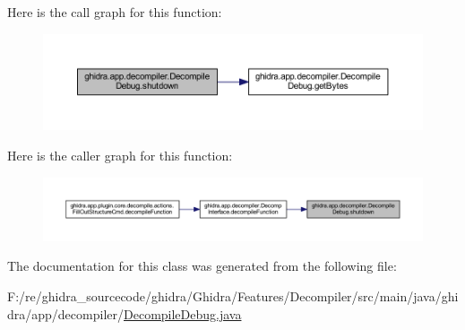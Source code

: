 Here is the call graph for this function\+:
\nopagebreak
\begin{figure}[H]
\begin{center}
\leavevmode
\includegraphics[width=350pt]{classghidra_1_1app_1_1decompiler_1_1_decompile_debug_a31d7bdb71f9cc5554a4c06d433e806d0_cgraph}
\end{center}
\end{figure}
Here is the caller graph for this function\+:
\nopagebreak
\begin{figure}[H]
\begin{center}
\leavevmode
\includegraphics[width=350pt]{classghidra_1_1app_1_1decompiler_1_1_decompile_debug_a31d7bdb71f9cc5554a4c06d433e806d0_icgraph}
\end{center}
\end{figure}


The documentation for this class was generated from the following file\+:\begin{DoxyCompactItemize}
\item 
F\+:/re/ghidra\+\_\+sourcecode/ghidra/\+Ghidra/\+Features/\+Decompiler/src/main/java/ghidra/app/decompiler/\mbox{\hyperlink{_decompile_debug_8java}{Decompile\+Debug.\+java}}\end{DoxyCompactItemize}
